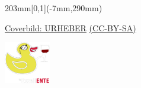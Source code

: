 \documentclass[a5paper]{scrbook}
\begin{document}
    \vfill

    \begin{textblock*}{203mm}[0,1](-7mm,290mm)
        \begin{flushright}
            \footnotesize
            \href{http://mathphys.info}{Coverbild: URHEBER} \href{http://creativecommons.org/licenses/by-sa/4.0/}{(CC-BY-SA)}\\  
        \end{flushright}
    \end{textblock*}



\null
\newpage

\pagestyle{empty}
\null
{}

\newpage

\pagestyle{empty}
\null
{}

\vspace{2cm}
\raggedright
\hspace{-1.25cm}
\includegraphics[angle=270, width=2cm]{media/exzellente}


\newpage
\end{document}
